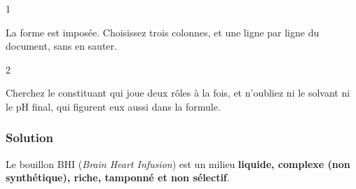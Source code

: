 \documentclass[11pt,a4paper]{article}
\begin{document}
\begin{indication}{1}

La forme est imposée. Choisissez trois colonnes, et une ligne par ligne du document, sans en sauter.

\end{indication}

\begin{indication}{2}

Cherchez le constituant qui joue deux rôles à la fois, et n'oubliez ni le solvant ni le pH final, qui figurent eux aussi dans la formule.

\end{indication}

\hypertarget{solution-7}{%
\subsubsection{Solution}\label{solution-7}}

Le bouillon BHI (\emph{Brain Heart Infusion}) est un milieu \textbf{liquide, complexe (non synthétique), riche, tamponné et non sélectif}.
\end{document}
